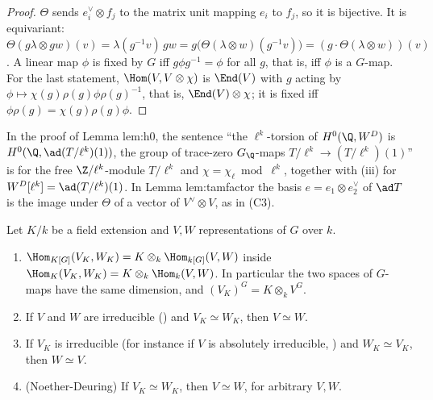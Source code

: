 \begin{proof}
$\Theta$ sends $e_i^\vee\otimes f_j$ to the matrix unit mapping $e_i$ to $f_j$, so it is bijective. It is equivariant:
$\Theta(g\lambda\otimes gw)(v)=\lambda(g^{-1}v)\,gw=g\bigl(\Theta(\lambda\otimes w)(g^{-1}v)\bigr)=(g\cdot\Theta(\lambda\otimes w))(v)$. A linear map $\phi$ is
fixed by $G$ iff $g\phi g^{-1}=\phi$ for all $g$, that is, iff $\phi$ is a $G$-map. For the last statement, $\Hom(V,V\otimes\chi)$ is $\End(V)$ with
$g$ acting by $\phi\mapsto\chi(g)\rho(g)\phi\rho(g)^{-1}$, that is, $\End(V)\otimes\chi$; it is fixed iff $\phi\rho(g)=\chi(g)\rho(g)\phi$.
\end{proof}

\begin{paperlink}
In the proof of Lemma lem:h0, the sentence ``the $\ell^k$-torsion of $H^0(\Q,W^D)$ is $H^0(\Q,\ad(T/\ell^k)(1))$, the group of
trace-zero $G_\Q$-maps $T/\ell^k\to(T/\ell^k)(1)$'' is  for the free $\Z/\ell^k$-module $T/\ell^k$ and $\chi=\chi_\ell\bmod\ell^k$, together with
(iii) for $W^D[\ell^k]=\ad(T/\ell^k)(1)$. In Lemma lem:tamfactor the basis $e=e_1\otimes e_2^\vee$ of $\ad T$ is the image
under $\Theta$ of a vector of $V^\vee\otimes V$, as in (C3).
\end{paperlink}

\begin{proposition}\label{prop:reps:scalars}
Let $K/k$ be a field extension and $V,W$ representations of $G$ over $k$.
\begin{enumerate}[label=(\roman*)]
\item $\Hom_{K[G]}(V_K,W_K)=K\otimes_k\Hom_{k[G]}(V,W)$ inside $\Hom_K(V_K,W_K)=K\otimes_k\Hom_k(V,W)$. In particular the two spaces of $G$-maps
have the same dimension, and $(V_K)^G=K\otimes_kV^G$.
\item If $V$ and $W$ are irreducible () and $V_K\simeq W_K$, then $V\simeq W$.
\item If $V_K$ is irreducible (for instance if $V$ is absolutely irreducible, ) and $W_K\simeq V_K$, then $W\simeq V$.
\item (Noether-Deuring) If $V_K\simeq W_K$, then $V\simeq W$, for arbitrary $V,W$.
\end{enumerate}
\end{proposition}

